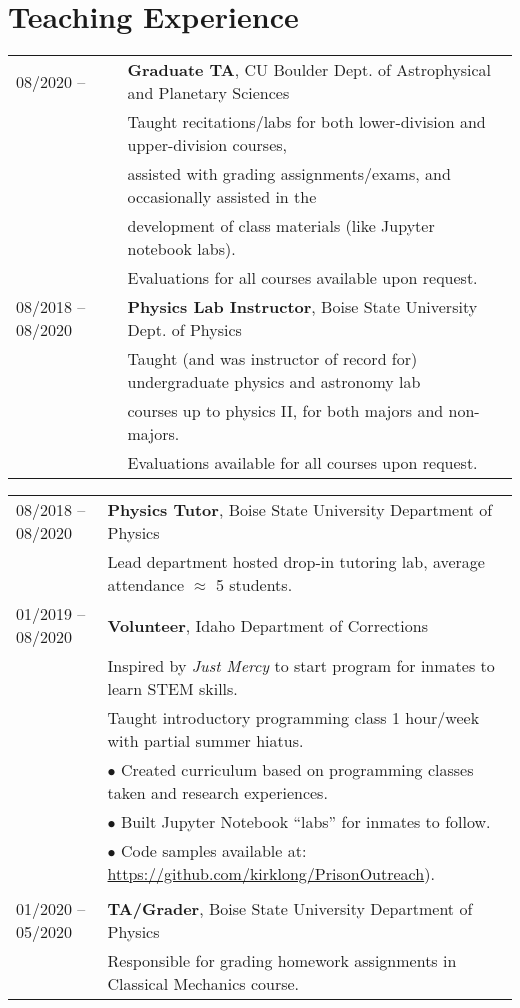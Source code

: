 \documentclass[11pt]{article}
\begin{document}
\section{Teaching Experience}
\begin{tabular}{ll}
08/2020 --	& 	\textbf{Graduate TA}, CU Boulder Dept. of Astrophysical and Planetary Sciences \vspace{1mm} \\
      & Taught recitations/labs for both lower-division and upper-division courses, \\
      & assisted with grading assignments/exams, and occasionally assisted in the \\
      & development of class materials (like Jupyter notebook labs).\\
      & Evaluations for all courses available upon request. \vspace{2mm} \\
08/2018 --	08/2020	& 	\textbf{Physics Lab Instructor}, Boise State University Dept. of Physics \vspace{1mm} \\
      & Taught (and was instructor of record for) undergraduate physics and astronomy lab \\
      & courses up to physics II, for both majors and non-majors.\\
      & Evaluations available for all courses upon request. \vspace{2mm} \\

\end{tabular}
\newpage
\begin{tabular}{ll}
08/2018 -- 08/2020   &   \textbf{Physics Tutor}, Boise State University Department of Physics \vspace{1mm} \\
      & Lead department hosted drop-in tutoring lab, average attendance $\approx$ 5 students. \vspace{2mm} \\
01/2019 -- 08/2020   &   \textbf{Volunteer}, Idaho Department of Corrections \\
      & Inspired by \textit{Just Mercy} to start program for inmates to learn STEM skills.\vspace{2mm} \\
      & Taught introductory programming class 1 hour/week with partial summer hiatus.\\
      & $\bullet$ Created curriculum based on programming classes taken and research experiences.\\
      & $\bullet$ Built Jupyter Notebook ``labs'' for inmates to follow. \\
      & $\bullet$ Code samples available at: \url{https://github.com/kirklong/PrisonOutreach}). \\
      & \\
01/2020 -- 05/2020   &   \textbf{TA/Grader}, Boise State University Department of Physics
\vspace{1mm} \\
      & Responsible for grading homework assignments in Classical Mechanics course. \\
\end{tabular}
\end{document}
